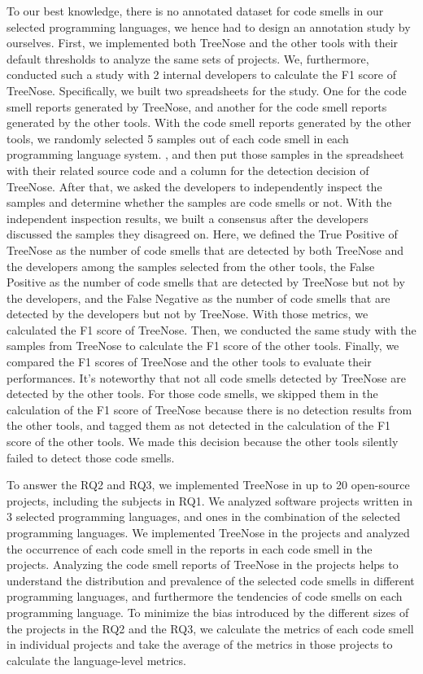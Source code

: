 To our best knowledge, there is no annotated dataset for code smells in our selected programming languages, we hence had to design an annotation study by ourselves.
First, we implemented both TreeNose and the other tools with their default thresholds to analyze the same sets of projects.
We, furthermore, conducted such a study with 2 internal developers to calculate the F1 score of TreeNose. Specifically, we built two spreadsheets for the study. 
One for the code smell reports generated by TreeNose, and another for the code smell reports generated by the other tools. 
With the code smell reports generated by the other tools, we randomly selected 5 samples out of each code smell in each programming language system. 
, and then put those samples in the spreadsheet with their related source code and a column for the detection decision of TreeNose.
After that, we asked the developers to independently inspect the samples and determine whether the samples are code smells or not. 
With the independent inspection results, we built a consensus after the developers discussed the samples they disagreed on.
Here, we defined the True Positive of TreeNose as the number of code smells that are detected by both TreeNose and the developers among the samples selected from the other tools, 
the False Positive as the number of code smells that are detected by TreeNose but not by the developers, and the False Negative as the number of code smells that are detected by the developers but not by TreeNose.
With those metrics, we calculated the F1 score of TreeNose. Then, we conducted the same study with the samples from TreeNose to calculate the F1 score of the other tools. 
Finally, we compared the F1 scores of TreeNose and the other tools to evaluate their performances. It's noteworthy that not all code smells detected by TreeNose are detected by the other tools. 
For those code smells, we skipped them in the calculation of the F1 score of TreeNose because there is no detection results from the other tools,
and tagged them as not detected in the calculation of the F1 score of the other tools. We made this decision because the other tools silently failed to detect those code smells.


To answer the RQ2 and RQ3, we implemented TreeNose in up to 20 open-source projects, including the subjects in RQ1.
 We analyzed software projects written in 3 selected programming languages, and ones in the combination of the selected programming languages. 
 We implemented TreeNose in the projects and analyzed the occurrence of each code smell in the reports in each code smell in the projects.
Analyzing the code smell reports of TreeNose in the projects helps to understand the distribution 
and prevalence of the selected code smells in different programming languages, and furthermore the tendencies of code smells on each programming language.
To minimize the bias introduced by the different sizes of the projects in the RQ2 and the RQ3, we calculate the metrics of each code smell in individual 
projects and take the average of the metrics in those projects to calculate the language-level metrics. 

